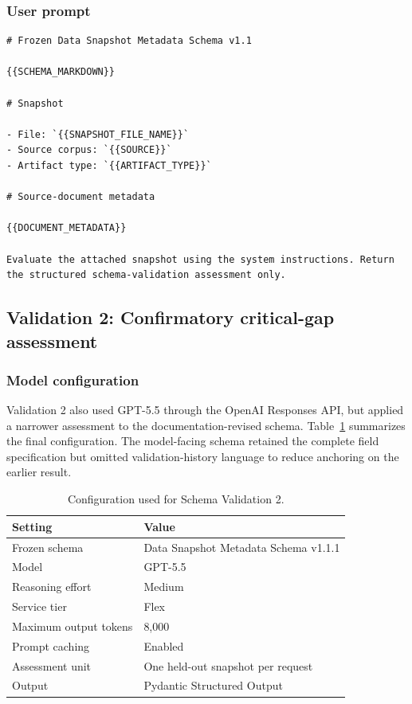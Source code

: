 \documentclass{article}
\begin{document}
\subsubsection{User prompt}

\begin{lstlisting}
# Frozen Data Snapshot Metadata Schema v1.1

{{SCHEMA_MARKDOWN}}

# Snapshot

- File: `{{SNAPSHOT_FILE_NAME}}`
- Source corpus: `{{SOURCE}}`
- Artifact type: `{{ARTIFACT_TYPE}}`

# Source-document metadata

{{DOCUMENT_METADATA}}

Evaluate the attached snapshot using the system instructions. Return the structured schema-validation assessment only.
\end{lstlisting}

\subsection{Validation 2: Confirmatory critical-gap assessment}

\subsubsection{Model configuration}

Validation 2 also used GPT-5.5 through the OpenAI Responses API, but applied a narrower assessment to the documentation-revised schema. Table~\ref{tab:schema_validation2_configuration} summarizes the final configuration. The model-facing schema retained the complete field specification but omitted validation-history language to reduce anchoring on the earlier result.

\begin{table}[!ht]
    \centering
    \caption{Configuration used for Schema Validation 2.}
    \label{tab:schema_validation2_configuration}
    \begin{tabular}{ll}
    \toprule
    \textbf{Setting} & \textbf{Value} \\
    \midrule
    Frozen schema & Data Snapshot Metadata Schema v1.1.1 \\
    Model & GPT-5.5 \\
    Reasoning effort & Medium \\
    Service tier & Flex \\
    Maximum output tokens & 8,000 \\
    Prompt caching & Enabled \\
    Assessment unit & One held-out snapshot per request \\
    Output & Pydantic Structured Output \\
    \bottomrule
    \end{tabular}
\end{table}
\end{document}

